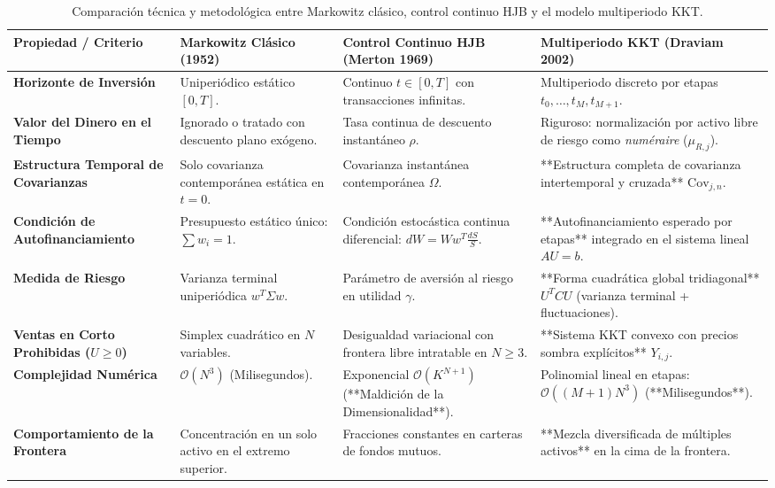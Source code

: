 \documentclass[11pt,a4paper]{report}
\numberwithin{equation}{chapter}
\begin{document}
\begin{table}[H]
\centering
\small
\renewcommand{\arraystretch}{1.3}
\begin{tabularx}{\textwidth}{p{3.5cm}XXX}
\toprule
\textbf{Propiedad / Criterio} & \textbf{Markowitz Clásico (1952)} & \textbf{Control Continuo HJB (Merton 1969)} & \textbf{Multiperiodo KKT (Draviam 2002)} \\
\midrule
\textbf{Horizonte de Inversión} & Uniperiódico estático $[0, T]$. & Continuo $t \in [0, T]$ con transacciones infinitas. & Multiperiodo discreto por etapas $t_0, \dots, t_M, t_{M+1}$. \\
\textbf{Valor del Dinero en el Tiempo} & Ignorado o tratado con descuento plano exógeno. & Tasa continua de descuento instantáneo $\rho$. & Riguroso: normalización por activo libre de riesgo como \emph{numéraire} ($\mu_{R,j}$). \\
\textbf{Estructura Temporal de Covarianzas} & Solo covarianza contemporánea estática en $t=0$. & Covarianza instantánea contemporánea $\Omega$. & **Estructura completa de covarianza intertemporal y cruzada** $\mathrm{Cov}_{j,n}$. \\
\textbf{Condición de Autofinanciamiento} & Presupuesto estático único: $\sum w_i = 1$. & Condición estocástica continua diferencial: $dW = W w^T \frac{dS}{S}$. & **Autofinanciamiento esperado por etapas** integrado en el sistema lineal $AU=b$. \\
\textbf{Medida de Riesgo} & Varianza terminal uniperiódica $w^T \Sigma w$. & Parámetro de aversión al riesgo en utilidad $\gamma$. & **Forma cuadrática global tridiagonal** $U^T C U$ (varianza terminal + fluctuaciones). \\
\textbf{Ventas en Corto Prohibidas ($U \ge 0$)} & Simplex cuadrático en $N$ variables. & Desigualdad variacional con frontera libre intratable en $N \ge 3$. & **Sistema KKT convexo con precios sombra explícitos** $Y_{i,j}$. \\
\textbf{Complejidad Numérica} & $\mathcal{O}(N^3)$ (Milisegundos). & Exponencial $\mathcal{O}(K^{N+1})$ (**Maldición de la Dimensionalidad**). & Polinomial lineal en etapas: $\mathcal{O}\left( (M+1) N^3 \right)$ (**Milisegundos**). \\
\textbf{Comportamiento de la Frontera} & Concentración en un solo activo en el extremo superior. & Fracciones constantes en carteras de fondos mutuos. & **Mezcla diversificada de múltiples activos** en la cima de la frontera. \\
\bottomrule
\end{tabularx}
\caption{Comparación técnica y metodológica entre Markowitz clásico, control continuo HJB y el modelo multiperiodo KKT.}
\label{tab:gran_comparacion}
\end{table}
\end{document}
